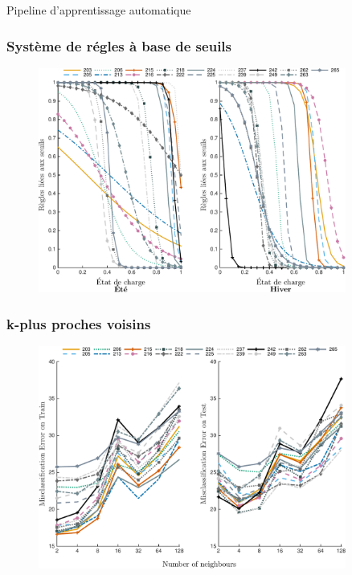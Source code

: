 \documentclass[french]{beamer}
\begin{document}
{\begin{frame}{Pipeline d'apprentissage automatique}
\begin{itemize}
\begin{itemize}
	\end{itemize}
\end{itemize}

\end{frame}


\begin{frame}
\frametitle{Système de régles à base de seuils} 
\begin{figure}
\begin{center}
\includegraphics[width=0.9\textwidth]{figtbrFr.pdf}
\end{center}
\end{figure}
\end{frame}
% 


\begin{frame}
\frametitle{k-plus proches voisins} 
\begin{figure}
\begin{center}
\includegraphics[width=0.9\textwidth]{figknn.pdf}
\end{center}
\end{figure}
\end{frame}
% 
% 

}
\end{document}
